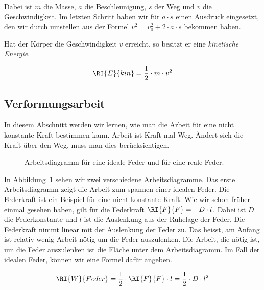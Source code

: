 Dabei ist $m$ die Masse, $a$ die Beschleunigung, $s$ der Weg und $v$ die Geschwindigkeit.
Im letzten Schritt haben wir für $a\cdot s$ einen Ausdruck eingesetzt, den wir durch umstellen aus der Formel
$v^2=v_0^2+2\cdot a\cdot s$ bekommen haben.

Hat der Körper die Geschwindigkeit $v$ erreicht, so besitzt er eine \emph{kinetische Energie}.

\begin{cbox}
\begin{equation*}
	\RI{E}{kin} = \frac{1}{2}\cdot m\cdot v^2
\end{equation*}
\end{cbox}


\newpage

\subsection*{Verformungsarbeit}
In diesem Abschnitt werden wir lernen, wie man die Arbeit für eine nicht konstante Kraft bestimmen kann.
Arbeit ist Kraft mal Weg. Ändert sich die Kraft über den Weg, muss man dies berücksichtigen.

\begin{figure}[h!]
\begin{center}

\end{center}
\caption{\label{fig:arbeitsdiagramm} Arbeitsdiagramm für eine ideale Feder und für eine reale Feder.
}
\end{figure}

In Abbildung~\ref{fig:arbeitsdiagramm} sehen wir zwei verschiedene Arbeitsdiagramme. 
Das erste Arbeitsdiagramm zeigt die Arbeit zum spannen einer idealen Feder.
Die Federkraft ist ein Beispiel für eine nicht konstante Kraft. 
Wie wir schon früher einmal gesehen haben,
gilt für die Federkraft $\RI{F}{F} = -D\cdot l$. Dabei ist $D$ die Federkonstante
und $l$ ist die Auslenkung aus der Ruhelage der Feder.
Die Federkraft nimmt linear mit der Auslenkung der Feder zu. Das heisst, am Anfang ist relativ wenig
Arbeit nötig um die Feder auszulenken. Die Arbeit, die nötig ist, um die Feder auszulenken ist
die Fläche unter dem Arbeitsdiagramm. Im Fall der idealen Feder, können wir eine Formel dafür angeben.


\begin{eqnarray*}
	\RI{W}{Feder}= \frac{1}{2}\cdot\RI{F}{F}\cdot l=\frac{1}{2}\cdot D\cdot l^2
\end{eqnarray*}

